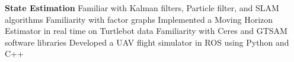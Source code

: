 \documentclass[letterpaper,MMMyyyy,nonstopmode]{simpleresumecv}
\begin{document}
\begin{Body}
\Gap 
\Entry 
{\textbf{State Estimation}}
\Gap 
\BulletItem 
Familiar with Kalman filters, Particle filter, and SLAM algorithms
\BulletItem
Familiarity with factor graphs
\BulletItem 
Implemented a Moving Horizon Estimator in real time on Turtlebot data
\BulletItem 
Familiarity with Ceres and GTSAM software libraries
\BulletItem 
Developed a UAV flight simulator in ROS using Python and C++

    
    













\end{Body}
\end{document}
